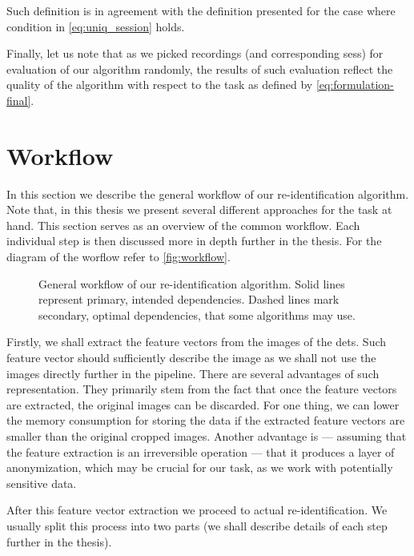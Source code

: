 Such definition is in agreement with the definition presented for the case
where condition in \autoref{eq:uniq_session} holds.

Finally, let us note that as we picked recordings (and corresponding
\glspl{ses}) for evaluation of our algorithm randomly, the results of such
evaluation reflect the quality of the algorithm with respect to the task as
defined by \autoref{eq:formulation-final}.


\section{Workflow}


In this section we describe the general workflow of our re-identification
algorithm. Note that, in this thesis we present several different
approaches for the task at hand. This section serves as an overview of the
common workflow. Each individual step is then discussed more in depth further
in the thesis. For the diagram of the worflow refer to \autoref{fig:workflow}.

\begin{figure}
    \centering
    \def\svgwidth{\textwidth}
    
    \caption[General workflow of our re-identification algorithm]{General workflow of our re-identification algorithm. Solid lines represent primary, intended dependencies.
    Dashed lines mark secondary, optimal dependencies, that some algorithms may use.}
    \label{fig:workflow}
\end{figure}

Firstly, we shall extract the feature vectors from the images of the
\glspl{det}. Such feature vector should sufficiently describe the image
as we shall not use the images directly further in the pipeline. There
are several advantages of such representation. They primarily stem from the fact
that once the feature vectors are extracted, the original images can be
discarded. For one thing, we can lower the memory consumption for storing
the data if the extracted feature vectors are smaller than the original
cropped images. Another advantage is --- assuming that the feature extraction
is an irreversible operation --- that it produces a layer of anonymization,
which may be crucial for our task, as we work with potentially sensitive
data.

After this feature vector extraction we proceed to actual re-identification.
We usually split this process into two parts (we shall describe details of
each step further in the thesis).

